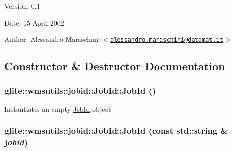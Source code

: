 \begin{Desc}
\item[Version:]0.1 \end{Desc}
\begin{Desc}
\item[Date:]15 April 2002 \end{Desc}
\begin{Desc}
\item[Author:]Alessandro Maraschini $<$\href{mailto:alessandro.maraschini@datamat.it}{\tt alessandro.maraschini@datamat.it}$>$ \end{Desc}




\subsection{Constructor \& Destructor Documentation}
\hypertarget{classglite_1_1wmsutils_1_1jobid_1_1JobId_z1_0}{
\subsubsection[JobId]{\setlength{\rightskip}{0pt plus 5cm}glite::wmsutils::jobid::Job\-Id::Job\-Id ()}}
\label{classglite_1_1wmsutils_1_1jobid_1_1JobId_z1_0}


Instantiates an empty \hyperlink{classglite_1_1wmsutils_1_1jobid_1_1JobId}{Job\-Id} object \hypertarget{classglite_1_1wmsutils_1_1jobid_1_1JobId_z1_1}{
\subsubsection[JobId]{\setlength{\rightskip}{0pt plus 5cm}glite::wmsutils::jobid::Job\-Id::Job\-Id (const std::string \& {\em jobid})}}
\label{classglite_1_1wmsutils_1_1jobid_1_1JobId_z1_1}


